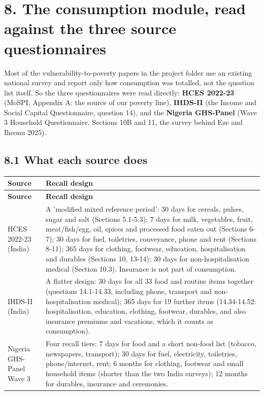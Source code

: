 \documentclass[10pt]{article}
\begin{document}
\section*{8. The consumption module, read against the three source questionnaires}
Most of the vulnerability-to-poverty papers in the project folder use an existing national survey and report only how consumption was totalled, not the question list itself.
So the three questionnaires were read directly: \textbf{HCES 2022-23} (MoSPI, Appendix A: the source of our poverty line), \textbf{IHDS-II} (the Income and Social Capital Questionnaire, question 14), and the \textbf{Nigeria GHS-Panel} (Wave 3 Household Questionnaire, Sections 10B and 11, the survey behind Eze and Iheonu 2025).
\subsection*{8.1 What each source does}
{\scriptsize
\begin{longtable}{p{3.6cm}p{13.6cm}}
\toprule
\textbf{Source} & \textbf{Recall design} \\
\midrule
\endfirsthead
\toprule
\textbf{Source} & \textbf{Recall design} \\
\midrule
\endhead
HCES 2022-23 (India) & A 'modified mixed reference period': 30 days for cereals, pulses, sugar and salt (Sections 5.1-5.3); 7 days for milk, vegetables, fruit, meat/fish/egg, oil, spices and processed food eaten out (Sections 6-7); 30 days for fuel, toiletries, conveyance, phone and rent (Sections 8-11); 365 days for clothing, footwear, education, hospitalisation and durables (Sections 10, 13-14); 30 days for non-hospitalisation medical (Section 10.3). Insurance is not part of consumption. \\
IHDS-II (India) & A flatter design: 30 days for all 33 food and routine items together (questions 14.1-14.33, including phone, transport and non-hospitalisation medical); 365 days for 19 further items (14.34-14.52: hospitalisation, education, clothing, footwear, durables, and also insurance premiums and vacations, which it counts as consumption). \\
Nigeria GHS-Panel Wave 3 & Four recall tiers: 7 days for food and a short non-food list (tobacco, newspapers, transport); 30 days for fuel, electricity, toiletries, phone/internet, rent; 6 months for clothing, footwear and small household items (shorter than the two India surveys); 12 months for durables, insurance and ceremonies. \\
\bottomrule
\end{longtable}
}
\end{document}
